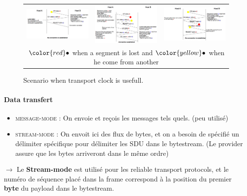 \begin{figure}[h]
    \centering
    \begin{tabular}{ccc}
    \includegraphics[width=5cm]{three1.png}
    &
    \includegraphics[width=5cm]{three2.png}
    &
    \includegraphics[width=5cm]{three3.png}
    \\
    \multicolumn{3}{c}{$\color{red} \bullet$ when a segment
    is lost and $\color{yellow} \bullet$ when he come from another}
\end{tabular}
\caption{Scenario when transport clock is usefull. }
\end{figure}

\paragraph{\textbf{Data transfert}}
\begin{itemize}
    \item \textsc{message-mode} : On envoie et reçois les messages tels quels. (peu utilisé)
    \item \textsc{stream-mode} : On envoit ici des flux de bytes, et on a besoin de spécifié un délimiter
spécifique pour délimiter les SDU dans le bytestream. (Le provider assure que les bytes arriveront dans le 
même ordre)
\end{itemize}

$\rightarrow$  Le \textbf{Stream-mode}  est utilisé  pour les  reliable
transport protocols,  et le  numéro de séquence  placé dans  la frame
correspond à la position du premier \textbf{byte} du payload dans le bytestream.


